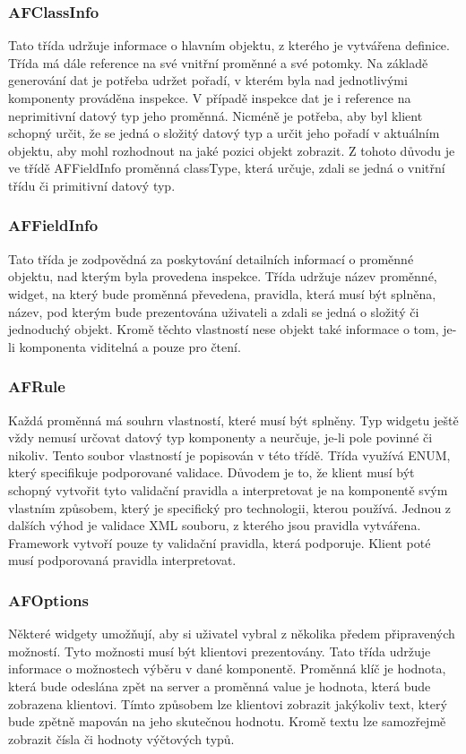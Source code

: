 \subsubsection{AFClassInfo}
Tato třída udržuje informace o hlavním objektu, z kterého je vytvářena definice. Třída má dále reference na své vnitřní proměnné a své potomky. Na základě generování dat je potřeba udržet pořadí, v kterém byla nad jednotlivými komponenty prováděna inspekce. V případě inspekce dat je i reference na neprimitivní datový typ jeho proměnná. Nicméně je potřeba, aby byl klient schopný určit, že se jedná o složitý datový typ a určit jeho pořadí v aktuálním objektu, aby mohl rozhodnout na jaké pozici objekt zobrazit. Z tohoto důvodu je ve třídě AFFieldInfo proměnná classType, která určuje, zdali se jedná o vnitřní třídu či primitivní datový typ.
\subsubsection{AFFieldInfo}
Tato třída je zodpovědná za poskytování detailních informací o proměnné objektu, nad kterým byla provedena inspekce. Třída udržuje název proměnné, widget, na který bude proměnná převedena, pravidla, která musí být splněna, název, pod kterým bude prezentována uživateli a zdali se jedná o složitý či jednoduchý objekt. Kromě těchto vlastností nese objekt také informace o tom, je-li komponenta viditelná a pouze pro čtení.
\subsubsection{AFRule}
Každá proměnná má souhrn vlastností, které musí být splněny. Typ widgetu ještě vždy nemusí určovat datový typ komponenty a neurčuje, je-li pole povinné či nikoliv. Tento soubor vlastností je popisován v této třídě. Třída využívá ENUM, který specifikuje podporované validace. Důvodem je to, že klient musí být schopný vytvořit tyto validační pravidla a interpretovat je na komponentě svým vlastním způsobem, který je specifický pro technologii, kterou používá. Jednou z dalších výhod je validace XML souboru, z kterého jsou pravidla vytvářena. Framework vytvoří pouze ty validační pravidla, která podporuje. Klient poté musí podporovaná pravidla interpretovat. 
\subsubsection{AFOptions}
Některé widgety umožňují, aby si uživatel vybral z několika předem připravených možností. Tyto možnosti musí být klientovi prezentovány. Tato třída udržuje informace o možnostech výběru v dané komponentě. Proměnná klíč je hodnota, která bude odeslána zpět na server a proměnná value je hodnota, která bude zobrazena klientovi. Tímto způsobem lze klientovi zobrazit jakýkoliv text, který bude zpětně mapován na jeho skutečnou hodnotu. Kromě textu lze samozřejmě zobrazit čísla či hodnoty výčtových typů.

